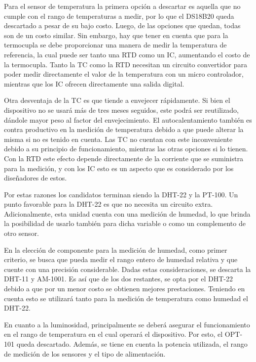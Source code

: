 
Para el sensor de temperatura la primera opción a descartar es aquella que no cumple con el rango de temperaturas a medir, por lo que el DS18B20 queda descartado a pesar de su bajo costo. Luego, de las opciones que quedan, todas son de un costo similar. Sin embargo, hay que tener en cuenta que para la termocupla se debe proporcionar una manera de medir la temperatura de referencia, la cual puede ser tanto una RTD como un IC, aumentando el costo de la termocupla. Tanto la TC como la RTD necesitan un circuito convertidor para poder medir directamente el valor de la temperatura con un micro controlador, mientras que los IC ofrecen directamente una salida digital.%

Otra desventaja de la TC es que tiende a envejecer rápidamente. Si bien el dispositivo no se usará más de tres meses seguidos, este podrá ser reutilizado, dándole mayor peso al factor del envejecimiento. El autocalentamiento también es contra productivo en la medición de temperatura debido a que puede alterar la misma si no es tenido en cuenta. Las TC no cuentan con este inconveniente debido a su principio de funcionamiento, mientras las otras opciones si lo tienen. Con la RTD este efecto depende directamente de la corriente que se suministra para la medición, y con los IC esto es un aspecto que es considerado por los diseñadores de estos.

Por estas razones los candidatos terminan siendo la DHT-22 y la PT-100. Un punto favorable para la DHT-22 es que no necesita un circuito extra. Adicionalmente, esta unidad cuenta con una medición de humedad, lo que brinda la posibilidad de usarlo también para dicha variable o como un complemento de otro sensor.

En la elección de componente para la medición de humedad, como primer criterio, se busca que pueda medir el rango entero de humedad relativa y que cuente con una precisión considerable. Dadas estas consideraciones, se descarta la DHT-11 y AM-1001. Es así que de los dos restantes, se opta por el DHT-22 debido a que por un menor costo se obtienen mejores prestaciones. Teniendo en cuenta esto se utilizará tanto para la medición de temperatura como humedad el DHT-22.

En cuanto a la luminosidad, principalmente se deberá asegurar el funcionamiento en el rango de temperatura en el cual operará el dispositivo. Por esto, el OPT-101 queda descartado. Además, se tiene en cuenta la potencia utilizada, el rango de medición de los sensores y el tipo de alimentación.

